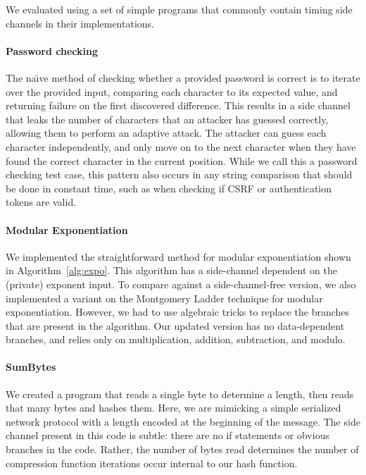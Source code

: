 

We evaluated \jcupid using a set of simple programs that commonly contain timing
side channels in their implementations.


\paragraph{Password checking}
The na\"{\i}ve method of checking whether a provided password is correct is to iterate
over the provided input, comparing each character to its expected value, and
returning failure on the first discovered difference. This results in a side
channel that leaks the number of characters that an attacker has guessed
correctly, allowing them to perform an adaptive attack. The attacker can guess
each character independently, and only move on to the next character when they
have found the correct character in the current position. While we call this a
password checking test case, this pattern also occurs in any string comparison
that should be done in constant time, such as when checking if CSRF or
authentication tokens are valid.


\paragraph{Modular Exponentiation}
We implemented the straightforward method for modular exponentiation shown in
Algorithm~\ref{alg:expo}. This algorithm has a side-channel dependent on the
(private) exponent input. To compare against a side-channel-free version,
we also implemented a variant on the Montgomery Ladder
technique for modular exponentiation. However, we had to use algebraic tricks to
replace the branches that are present in the algorithm. Our updated version has no
data-dependent branches, and relies only on multiplication, addition,
subtraction, and modulo.


\paragraph{SumBytes}
We created a program that reads a single byte to determine a length, then reads
that many bytes and hashes them. Here, we are mimicking a simple serialized
network protocol with a length encoded at the beginning of the message. The side
channel present in this code is subtle: there are no if statements or obvious
branches in the code. Rather, the number of bytes read determines the number of
compression function iterations occur internal to our hash function.


